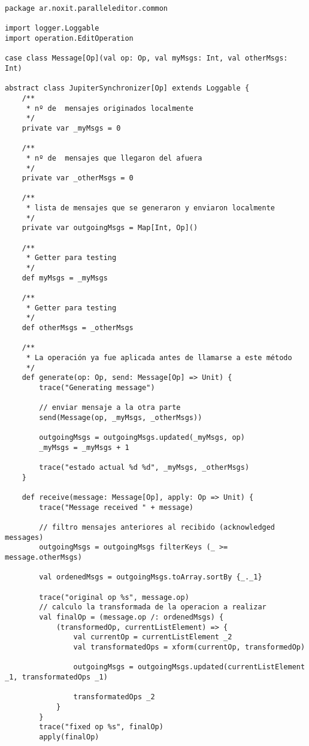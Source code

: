 {
\tiny
\begin{verbatim}
package ar.noxit.paralleleditor.common

import logger.Loggable
import operation.EditOperation

case class Message[Op](val op: Op, val myMsgs: Int, val otherMsgs: Int)

abstract class JupiterSynchronizer[Op] extends Loggable {
    /**
     * nº de  mensajes originados localmente
     */
    private var _myMsgs = 0

    /**
     * nº de  mensajes que llegaron del afuera
     */
    private var _otherMsgs = 0

    /**
     * lista de mensajes que se generaron y enviaron localmente
     */
    private var outgoingMsgs = Map[Int, Op]()

    /**
     * Getter para testing
     */
    def myMsgs = _myMsgs

    /**
     * Getter para testing
     */
    def otherMsgs = _otherMsgs

    /**
     * La operación ya fue aplicada antes de llamarse a este método
     */
    def generate(op: Op, send: Message[Op] => Unit) {
        trace("Generating message")

        // enviar mensaje a la otra parte
        send(Message(op, _myMsgs, _otherMsgs))

        outgoingMsgs = outgoingMsgs.updated(_myMsgs, op)
        _myMsgs = _myMsgs + 1

        trace("estado actual %d %d", _myMsgs, _otherMsgs)
    }

    def receive(message: Message[Op], apply: Op => Unit) {
        trace("Message received " + message)

        // filtro mensajes anteriores al recibido (acknowledged messages)
        outgoingMsgs = outgoingMsgs filterKeys (_ >= message.otherMsgs)

        val ordenedMsgs = outgoingMsgs.toArray.sortBy {_._1}

        trace("original op %s", message.op)
        // calculo la transformada de la operacion a realizar
        val finalOp = (message.op /: ordenedMsgs) {
            (transformedOp, currentListElement) => {
                val currentOp = currentListElement _2
                val transformatedOps = xform(currentOp, transformedOp)

                outgoingMsgs = outgoingMsgs.updated(currentListElement _1, transformatedOps _1)

                transformatedOps _2
            }
        }
        trace("fixed op %s", finalOp)
        apply(finalOp)


\end{verbatim}}
